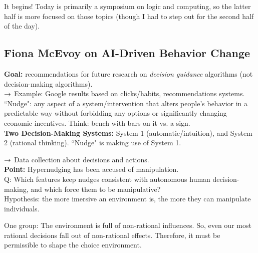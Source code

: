 It begins! Today is primarily a symposium on logic and computing, so the latter half is more focused on those topics (though I had to step out for the second half of the day).

\subsection{Fiona McEvoy on AI-Driven Behavior Change}

{\bf Goal:} recommendations for future research on {\it decision guidance} algorithms (not decision-making algorithms). \\

$\rightarrow$ Example: Google results based on clicks/habits, recommendations systems. \\

``Nudge": any aspect of a system/intervention that alters people's behavior in a predictable way without forbidding any options or significantly changing economic incentives. Think: bench with bars on it vs. a sign. \\

{\bf Two Decision-Making Systems:} System 1 (automatic/intuition), and System 2 (rational thinking). ``Nudge" is making use of System 1. \\


$\rightarrow$ Data collection about decisions and actions. \\

{\bf Point:} Hypernudging has been accused of manipulation. \\

Q: Which features keep nudges consistent with autonomous human decision-making, and which force them to be manipulative? \\

Hypothesis: the more imersive an environment is, the more they can manipulate individuals. \\


One group: The environment is full of non-rational influences. So, even our most rational decisions fall out of non-rational effects. Therefore, it must be permissible to shape the choice environment. \\


